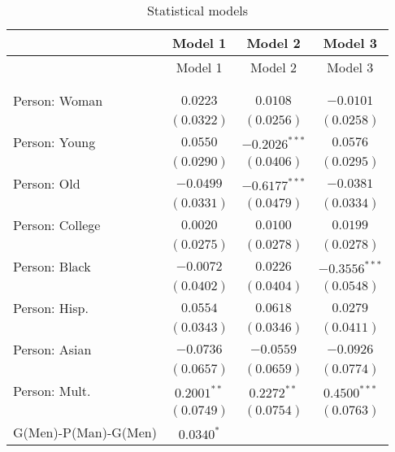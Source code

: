
\begin{center}
\begin{longtable}{l c c c}
\toprule
 & Model 1 & Model 2 & Model 3 \\
\midrule
\endfirsthead
\toprule
 & Model 1 & Model 2 & Model 3 \\
\midrule
\endhead
\bottomrule
\endfoot
\bottomrule
\multicolumn{4}{l}{\scriptsize{$^{***}p<0.001$; $^{**}p<0.01$; $^{*}p<0.05$}}\\
\caption{Statistical models}
\label{table:coefficients}
\endlastfoot \\
Person: Woman              & $0.0223$       & $0.0108$        & $-0.0101$       \\
                           & $(0.0322)$     & $(0.0256)$      & $(0.0258)$      \\
Person: Young              & $0.0550$       & $-0.2026^{***}$ & $0.0576$        \\
                           & $(0.0290)$     & $(0.0406)$      & $(0.0295)$      \\
Person: Old                & $-0.0499$      & $-0.6177^{***}$ & $-0.0381$       \\
                           & $(0.0331)$     & $(0.0479)$      & $(0.0334)$      \\
Person: College            & $0.0020$       & $0.0100$        & $0.0199$        \\
                           & $(0.0275)$     & $(0.0278)$      & $(0.0278)$      \\
Person: Black              & $-0.0072$      & $0.0226$        & $-0.3556^{***}$ \\
                           & $(0.0402)$     & $(0.0404)$      & $(0.0548)$      \\
Person: Hisp.              & $0.0554$       & $0.0618$        & $0.0279$        \\
                           & $(0.0343)$     & $(0.0346)$      & $(0.0411)$      \\
Person: Asian              & $-0.0736$      & $-0.0559$       & $-0.0926$       \\
                           & $(0.0657)$     & $(0.0659)$      & $(0.0774)$      \\
Person: Mult.              & $0.2001^{**}$  & $0.2272^{**}$   & $0.4500^{***}$  \\
                           & $(0.0749)$     & $(0.0754)$      & $(0.0763)$      \\
G(Men)-P(Man)-G(Men)       & $0.0340^{*}$   &                 &                 \\

\end{longtable}
\end{center}
